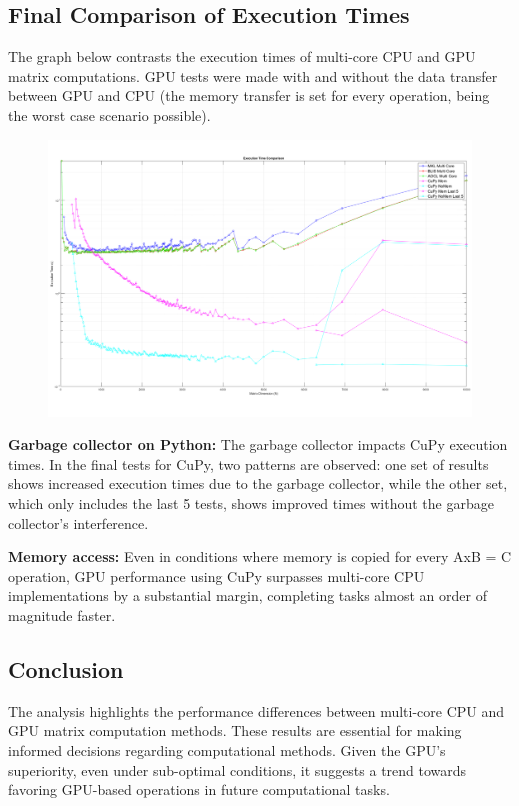 \subsection{Final Comparison of Execution Times}

The graph below contrasts the execution times of multi-core CPU and GPU matrix computations. GPU tests were made with and without the data transfer between GPU and CPU (the memory transfer is set for every operation, being the worst case scenario possible).

\begin{figure}[h!] %
    \centering
    \includegraphics[width=\linewidth]{Figures/Imagenes/Final3.png} %
\end{figure}

\vspace{-1em}

\textbf{Garbage collector on Python:} The garbage collector impacts CuPy execution times. In the final tests for CuPy, two patterns are observed: one set of results shows increased execution times due to the garbage collector, while the other set, which only includes the last 5 tests, shows improved times without the garbage collector's interference.

\textbf{Memory access:} Even in conditions where memory is copied for every AxB = C operation, GPU performance using CuPy surpasses multi-core CPU implementations by a substantial margin, completing tasks almost an order of magnitude faster.

\subsection{Conclusion}

The analysis highlights the performance differences between multi-core CPU and GPU matrix computation methods. These results are essential for making informed decisions regarding computational methods. Given the GPU's superiority, even under sub-optimal conditions, it suggests a trend towards favoring GPU-based operations in future computational tasks.




